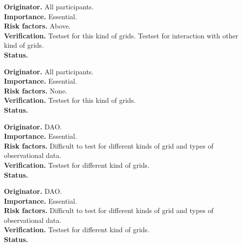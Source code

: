 \begin{reqlist}
{\bf Originator.} All participants. \\
{\bf Importance.} Essential. \\
{\bf Risk factors.} Above. \\
{\bf Verification.} Testset for this kind of grids. Testset for interaction 
with other kind of grids. \\
{\bf Status.} 
\end{reqlist}



\begin{reqlist}
{\bf Originator.} All participants. \\
{\bf Importance.} Essential. \\
{\bf Risk factors.} None. \\
{\bf Verification.} Testset for this kind of grids. \\
{\bf Status.} 
\end{reqlist}




\begin{reqlist}
{\bf Originator.} DAO. \\
{\bf Importance.} Essential. \\
{\bf Risk factors.} Difficult to test for different kinds of grid and types 
of observational data. \\
{\bf Verification.} Testset for different kind of grids. \\
{\bf Status.} 
\end{reqlist}



\begin{reqlist}
{\bf Originator.} DAO. \\
{\bf Importance.} Essential. \\
{\bf Risk factors.} Difficult to test for different kinds of grid and types 
of observational data. \\
{\bf Verification.} Testset for different kind of grids. \\
{\bf Status.} 
\end{reqlist}


